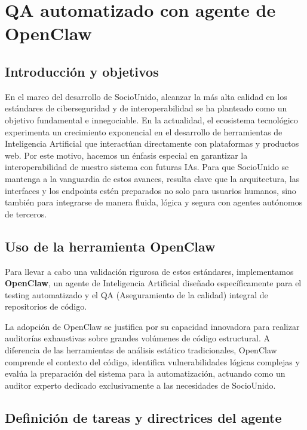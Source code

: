 \section{QA automatizado con agente de OpenClaw}

\subsection{Introducción y objetivos}

En el marco del desarrollo de SocioUnido, alcanzar la más alta calidad en los estándares de ciberseguridad y de interoperabilidad se ha planteado como un objetivo fundamental e innegociable. En la actualidad, el ecosistema tecnológico experimenta un crecimiento exponencial en el desarrollo de herramientas de Inteligencia Artificial que interactúan directamente con plataformas y productos web. Por este motivo, hacemos un énfasis especial en garantizar la interoperabilidad de nuestro sistema con futuras IAs. Para que SocioUnido se mantenga a la vanguardia de estos avances, resulta clave que la arquitectura, las interfaces y los endpoints estén preparados no solo para usuarios humanos, sino también para integrarse de manera fluida, lógica y segura con agentes autónomos de terceros.

\subsection{Uso de la herramienta OpenClaw}

Para llevar a cabo una validación rigurosa de estos estándares, implementamos \textbf{OpenClaw}, un agente de Inteligencia Artificial diseñado específicamente para el testing automatizado y el QA (Aseguramiento de la calidad) integral de repositorios de código. 

La adopción de OpenClaw se justifica por su capacidad innovadora para realizar auditorías exhaustivas sobre grandes volúmenes de código estructural. A diferencia de las herramientas de análisis estático tradicionales, OpenClaw comprende el contexto del código, identifica vulnerabilidades lógicas complejas y evalúa la preparación del sistema para la automatización, actuando como un auditor experto dedicado exclusivamente a las necesidades de SocioUnido.

\subsection{Definición de tareas y directrices del agente}


